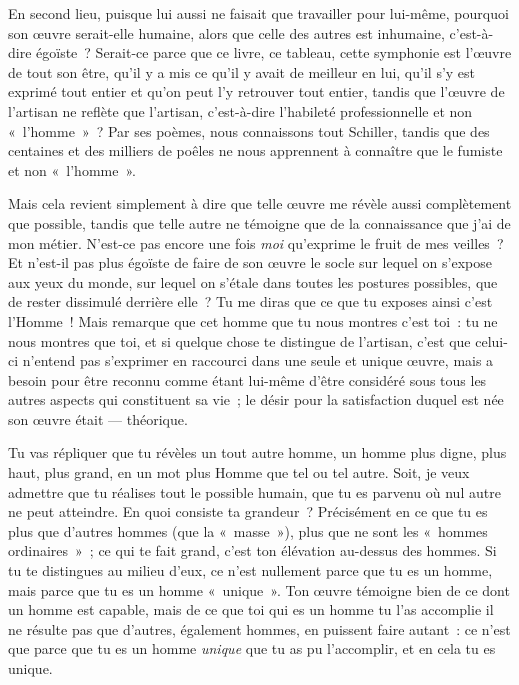 \documentclass[french,twoside]{book} %
\begin{document}
En second lieu, puisque lui aussi ne faisait que travailler pour lui-même, pourquoi son œuvre serait-elle humaine, alors que celle des autres est inhumaine, c’est-à-dire égoïste ? Serait-ce parce que ce livre, ce tableau, cette symphonie est l’œuvre de tout son être, qu’il y a mis ce qu’il y avait de meilleur en lui, qu’il s’y est exprimé tout entier et qu’on peut l’y retrouver tout entier, tandis que l’œuvre de l’artisan ne reflète que l’artisan, c’est-à-dire l’habileté professionnelle et non « l’homme » ? Par ses poèmes, nous connaissons tout Schiller, tandis que des centaines et des milliers de poêles ne nous apprennent à connaître que le fumiste et non « l’homme ».\par
Mais cela revient simplement à dire que telle œuvre me révèle aussi complètement que possible, tandis que telle autre ne témoigne que de la connaissance que j’ai de mon métier. N’est-ce pas encore une fois \emph{moi }qu’exprime le fruit de mes veilles ? Et n’est-il pas plus égoïste de faire de son œuvre le socle sur lequel on s’expose aux yeux du monde, sur lequel on s’étale dans toutes les postures possibles, que de rester dissimulé derrière elle ? Tu me diras que ce que tu exposes ainsi c’est l’Homme ! Mais remarque que cet homme que tu nous montres c’est toi : tu ne nous montres que toi, et si quelque chose te distingue de l’artisan, c’est que celui-ci n’entend pas s’exprimer en raccourci dans une seule et unique œuvre, mais a besoin pour être reconnu comme étant lui-même d’être considéré  sous tous les autres aspects qui constituent sa vie ; le désir pour la satisfaction duquel est née son œuvre était — théorique.\par
Tu vas répliquer que tu révèles un tout autre homme, un homme plus digne, plus haut, plus grand, en un mot plus Homme que tel ou tel autre. Soit, je veux admettre que tu réalises tout le possible humain, que tu es parvenu où nul autre ne peut atteindre. En quoi consiste ta grandeur ? Précisément en ce que tu es plus que d’autres hommes (que la « masse »), plus que ne sont les « hommes ordinaires » ; ce qui te fait grand, c’est ton élévation au-dessus des hommes. Si tu te distingues au milieu d’eux, ce n’est nullement parce que tu es un homme, mais parce que tu es un homme « unique ». Ton œuvre témoigne bien de ce dont un homme est capable, mais de ce que toi qui es un homme tu l’as accomplie il ne résulte pas que d’autres, également hommes, en puissent faire autant : ce n’est que parce que tu es un homme \emph{unique} que tu as pu l’accomplir, et en cela tu es unique.\par
\end{document}
